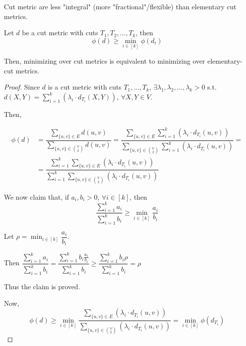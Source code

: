     Cut metric are less "integral" (more "fractional"/flexible) than elementary cut metrics.

    \begin{lemma}\label{lemma:metric3}
        Let $d$ be a cut metric with cuts $T_1, T_2, \dots, T_k$, then
        \[ \phi(d) \geq \min_{i \in [k]} \phi(d_i) \]
    \end{lemma}

    Then, minimizing over cut metrics is equivalent to minimizing over elementary-cut metrics.

    \begin{proof}
        Since $d$ is a cut metric with cuts $T_1, \dots, T_k$, $\exists \lambda_1, \lambda_2, \dots, \lambda_k > 0$ s.t. $d(X,Y) = \sum_{i=1}^k(\lambda_i \cdot d_{T_i}(X,Y))$, $\forall X,Y \in V$.

        Then,

        \begin{equation*}
            \begin{split}
                \phi(d) &= \dfrac{\sum_{\{u,v\} \in E} d(u,v)}{\sum_{\{u,v\} \in \binom{V}{2}} d(u,v)} = \dfrac{\sum_{\{u,v\} \in E} \sum_{i=1}^{k} (\lambda_i \cdot d_{T_i}(u,v))}{\sum_{\{u,v\} \in \binom{V}{2}} \sum_{i=1}^{k} (\lambda_i \cdot d_{T_i}(u,v))} =\\
                        &= \dfrac{\sum_{i=1}^{k} \sum_{\{u,v\} \in E} (\lambda_i \cdot d_{T_i}(u,v))}{\sum_{i=1}^{k} \sum_{\{u,v\} \in \binom{V}{2}} (\lambda_i \cdot d_{T_i}(u,v))}
            \end{split}
        \end{equation*}

        We now claim that, if $a_i, b_i > 0$, $\forall i \in [k]$, then
        \[ \dfrac{\sum_{i=1}^k a_i}{\sum_{i=1}^k b_i} \geq \min_{i \in [k]} \dfrac{a_i}{b_i} \]

        Let $\rho = \min_{i \in [k]} \dfrac{a_i}{b_i}$.

        Then
        $\dfrac{\sum_{i=1}^k a_i}{\sum_{i=1}^k b_i} = 
        \dfrac{\sum_{i=1}^k b_i \frac{a_i}{b_i}}{\sum_{i=1}^k b_i} \geq
        \dfrac{\sum_{i=1}^k b_i \rho}{\sum_{i=1}^k b_i} =
        \rho$

        Thus the claim is proved.

        Now,
        \[ \phi(d) \geq \min_{i \in [k]} \dfrac{\sum_{\{u,v\} \in E} (\lambda_i \cdot d_{T_i}(u,v))}{\sum_{\{u,v\} \in \binom{V}{2}} (\lambda_i \cdot d_{T_i}(u,v))} = \min_{i \in [k]} \phi(d_{T_i}) \]
    \end{proof}

